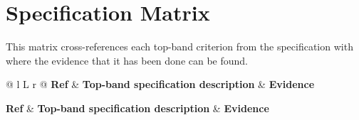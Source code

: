 \section{Specification Matrix}

This matrix cross-references each top-band criterion from the specification with where the evidence that it has been done can be found.

\vspace{1em}

{\small
\renewcommand{\arraystretch}{1.2}
\begin{xltabular}{\textwidth}{@{} l L r @{}}
	\toprule
	\textbf{Ref} & \textbf{Top-band specification description} & \textbf{Evidence} \\
	\midrule
	\endfirsthead

	\toprule
	\textbf{Ref} & \textbf{Top-band specification description} & \textbf{Evidence} \\
	\midrule
	\endhead


	 \\
	\midrule

	\midrule
	 \\
	\midrule

	\midrule
	 \\
	\midrule

	\midrule
	 \\
	\midrule
\end{xltabular}
}
